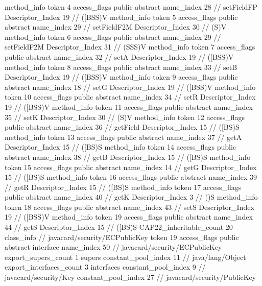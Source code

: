 {{{{{				}
				method_info {
					token	4
					access_flags	public abstract
					name_index	28		// setFieldFP
					Descriptor_Index	19		// ([BSS)V
				}
				method_info {
					token	5
					access_flags	public abstract
					name_index	29		// setFieldF2M
					Descriptor_Index	30		// (S)V
				}
				method_info {
					token	6
					access_flags	public abstract
					name_index	29		// setFieldF2M
					Descriptor_Index	31		// (SSS)V
				}
				method_info {
					token	7
					access_flags	public abstract
					name_index	32		// setA
					Descriptor_Index	19		// ([BSS)V
				}
				method_info {
					token	8
					access_flags	public abstract
					name_index	33		// setB
					Descriptor_Index	19		// ([BSS)V
				}
				method_info {
					token	9
					access_flags	public abstract
					name_index	18		// setG
					Descriptor_Index	19		// ([BSS)V
				}
				method_info {
					token	10
					access_flags	public abstract
					name_index	34		// setR
					Descriptor_Index	19		// ([BSS)V
				}
				method_info {
					token	11
					access_flags	public abstract
					name_index	35		// setK
					Descriptor_Index	30		// (S)V
				}
				method_info {
					token	12
					access_flags	public abstract
					name_index	36		// getField
					Descriptor_Index	15		// ([BS)S
				}
				method_info {
					token	13
					access_flags	public abstract
					name_index	37		// getA
					Descriptor_Index	15		// ([BS)S
				}
				method_info {
					token	14
					access_flags	public abstract
					name_index	38		// getB
					Descriptor_Index	15		// ([BS)S
				}
				method_info {
					token	15
					access_flags	public abstract
					name_index	14		// getG
					Descriptor_Index	15		// ([BS)S
				}
				method_info {
					token	16
					access_flags	public abstract
					name_index	39		// getR
					Descriptor_Index	15		// ([BS)S
				}
				method_info {
					token	17
					access_flags	public abstract
					name_index	40		// getK
					Descriptor_Index	3		// ()S
				}
				method_info {
					token	18
					access_flags	public abstract
					name_index	43		// setS
					Descriptor_Index	19		// ([BSS)V
				}
				method_info {
					token	19
					access_flags	public abstract
					name_index	44		// getS
					Descriptor_Index	15		// ([BS)S
				}
			}
			CAP22_inheritable_count	20
		}
		class_info {		// javacard/security/ECPublicKey
			token	19
			access_flags	public abstract interface
			name_index	50		// javacard/security/ECPublicKey
			export_supers_count	1
			supers {
				constant_pool_index	11		// java/lang/Object
			}
			export_interfaces_count	3
			interfaces {
				constant_pool_index	9		// javacard/security/Key
				constant_pool_index	27		// javacard/security/PublicKey
}}}}
